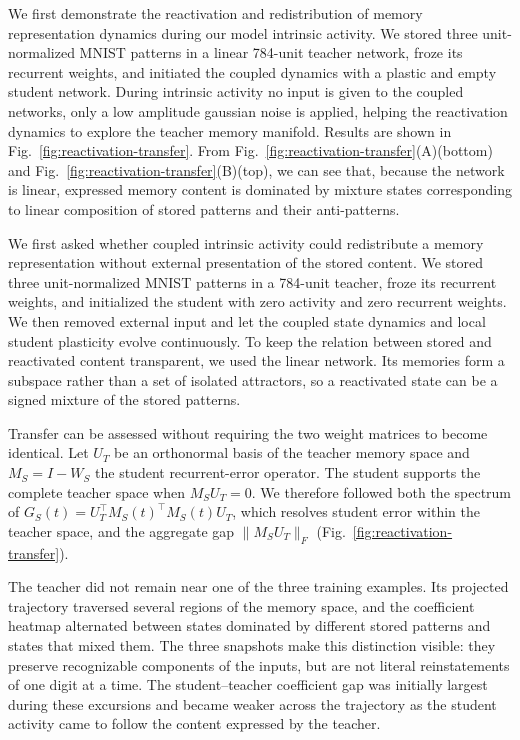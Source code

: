 \documentclass[10pt,letterpaper]{article}
\theoremstyle{plain}
\theoremstyle{remark}
\begin{document}
We first demonstrate the reactivation and redistribution of memory representation dynamics during our model intrinsic activity.
We stored three unit-normalized MNIST patterns in a linear 784-unit teacher network, froze its recurrent weights, and initiated the coupled dynamics with a plastic and empty student network. During intrinsic activity no input is given to the coupled networks, only a low amplitude gaussian noise is applied, helping the reactivation dynamics to explore the teacher memory manifold. Results are shown in Fig.~\ref{fig:reactivation-transfer}.
From Fig.~\ref{fig:reactivation-transfer}(A)(bottom) and Fig.~\ref{fig:reactivation-transfer}(B)(top), we can see that, because the network is linear, expressed memory content is dominated by mixture states corresponding to linear composition of stored patterns and their anti-patterns.

We first asked whether coupled intrinsic activity could redistribute a memory representation without external presentation of the stored content. We stored three unit-normalized MNIST patterns in a 784-unit teacher, froze its recurrent weights, and initialized the student with zero activity and zero recurrent weights. We then removed external input and let the coupled state dynamics and local student plasticity evolve continuously. To keep the relation between stored and reactivated content transparent, we used the linear network. Its memories form a subspace rather than a set of isolated attractors, so a reactivated state can be a signed mixture of the stored patterns.

Transfer can be assessed without requiring the two weight matrices to become identical. Let $U_T$ be an orthonormal basis of the teacher memory space and $M_S=I-W_S$ the student recurrent-error operator. The student supports the complete teacher space when $M_SU_T=0$. We therefore followed both the spectrum of $G_S(t)=U_T^\top M_S(t)^\top M_S(t)U_T$, which resolves student error within the teacher space, and the aggregate gap $\lVert M_SU_T\rVert_F$ (Fig.~\ref{fig:reactivation-transfer}).


The teacher did not remain near one of the three training examples. Its projected trajectory traversed several regions of the memory space, and the coefficient heatmap alternated between states dominated by different stored patterns and states that mixed them. The three snapshots make this distinction visible: they preserve recognizable components of the inputs, but are not literal reinstatements of one digit at a time. The student--teacher coefficient gap was initially largest during these excursions and became weaker across the trajectory as the student activity came to follow the content expressed by the teacher.
\end{document}
